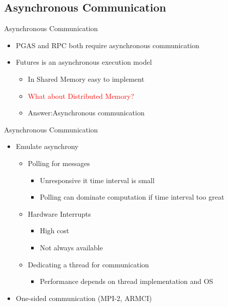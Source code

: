 \documentclass[svgnames]{beamer}
\begin{document}
\subsection{Asynchronous Communication}
\begin{frame}{Asynchronous Communication}
\begin{itemize}
	\item PGAS and RPC both require asynchronous communication
	\item Futures is an asynchronous execution model
	\begin{itemize}
		\item In Shared Memory easy to implement
		\item<2-> \textcolor{red}{What about Distributed Memory?}
		\item<3-> Answer:Asynchronous communication
	\end{itemize}
\end{itemize}
\end{frame}
\begin{frame}{Asynchronous Communication}
\begin{itemize}
	\item Emulate asynchrony
	\begin{itemize}
		\item Polling for messages
		\begin{itemize}
			\item Unresponsive it time interval is small
			\item Polling can dominate computation if time interval too great
		\end{itemize}
		\item Hardware Interrupts
		\begin{itemize}
			\item High cost
			\item Not always available
		\end{itemize}
		\item Dedicating a thread for communication
		\begin{itemize}
			\item Performance depends on thread implementation and OS
		\end{itemize}
	\end{itemize}
	\item<2-> One-sided communication (MPI-2, ARMCI)
\end{itemize}
\end{frame}
\end{document}
